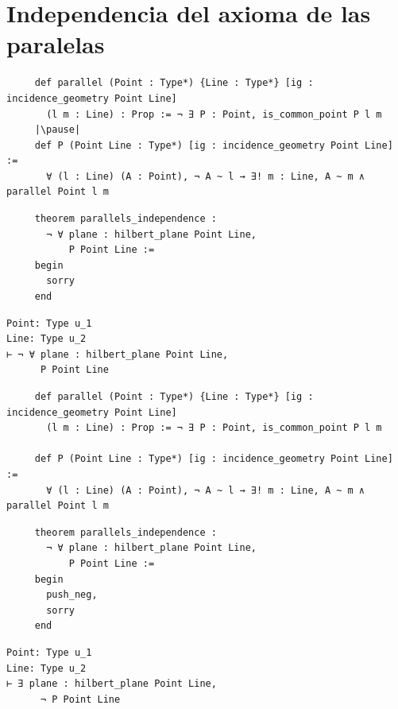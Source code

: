 \documentclass[t, aspectratio=169]{beamer}
\begin{document}
\section{Independencia del axioma de las paralelas}
\begin{frame}[fragile]
	\begin{lstlisting}
     def parallel (Point : Type*) {Line : Type*} [ig : incidence_geometry Point Line] 
       (l m : Line) : Prop := ¬ ∃ P : Point, is_common_point P l m
     |\pause|
     def P (Point Line : Type*) [ig : incidence_geometry Point Line] := 
       ∀ (l : Line) (A : Point), ¬ A ~ l → ∃! m : Line, A ~ m ∧ parallel Point l m
    \end{lstlisting}
	\pause
	\begin{multicols}{2}
		\begin{lstlisting}
     theorem parallels_independence :
       ¬ ∀ plane : hilbert_plane Point Line, 
           P Point Line := 
     begin
       sorry
     end
        \end{lstlisting}
		\columnbreak
		\pause
		\begin{lstlisting}
Point: Type u_1
Line: Type u_2
⊢ ¬ ∀ plane : hilbert_plane Point Line, 
      P Point Line
        \end{lstlisting}
	\end{multicols}
\end{frame}

\begin{frame}[fragile]
	\begin{lstlisting}
     def parallel (Point : Type*) {Line : Type*} [ig : incidence_geometry Point Line] 
       (l m : Line) : Prop := ¬ ∃ P : Point, is_common_point P l m

     def P (Point Line : Type*) [ig : incidence_geometry Point Line] := 
       ∀ (l : Line) (A : Point), ¬ A ~ l → ∃! m : Line, A ~ m ∧ parallel Point l m
    \end{lstlisting}

	\begin{multicols}{2}
		\begin{lstlisting}
     theorem parallels_independence :
       ¬ ∀ plane : hilbert_plane Point Line, 
           P Point Line := 
     begin
       push_neg, 
       sorry
     end
        \end{lstlisting}
		\columnbreak

		\begin{lstlisting}
Point: Type u_1
Line: Type u_2
⊢ ∃ plane : hilbert_plane Point Line, 
      ¬ P Point Line
        \end{lstlisting}
	\end{multicols}
\end{frame}
\end{document}
